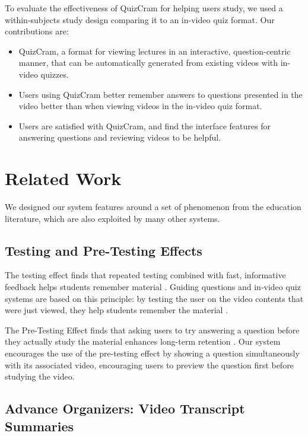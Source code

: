 \documentclass{sigchi}
\begin{document}
To evaluate the effectiveness of QuizCram for helping users study, we used a within-subjects study design comparing it to an in-video quiz format. Our contributions are:

\begin{itemize}
\item QuizCram, a format for viewing lectures in an interactive, question-centric manner, that can be automatically generated from existing videos with in-video quizzes.
\item Users using QuizCram better remember answers to questions presented in the video better than when viewing videos in the in-video quiz format.
\item Users are satisfied with QuizCram, and find the interface features for answering questions and reviewing videos to be helpful.
\end{itemize}

\section{Related Work}

We designed our system features around a set of phenomenon from the education literature, which are also exploited by many other systems.

\subsection{Testing and Pre-Testing Effects}

The testing effect finds that repeated testing combined with fast, informative feedback helps students remember material \cite{testingeffect}. Guiding questions and in-video quiz systems are based on this principle: by testing the user on the video contents that were just viewed, they help students remember the material \cite{guidingquestions}.

The Pre-Testing Effect finds that asking users to try answering a question before they actually study the material enhances long-term retention \cite{pretesting}. Our system encourages the use of the pre-testing effect by showing a question simultaneously with its associated video, encouraging users to preview the question first before studying the video.

\subsection{Advance Organizers: Video Transcript Summaries}
\end{document}
